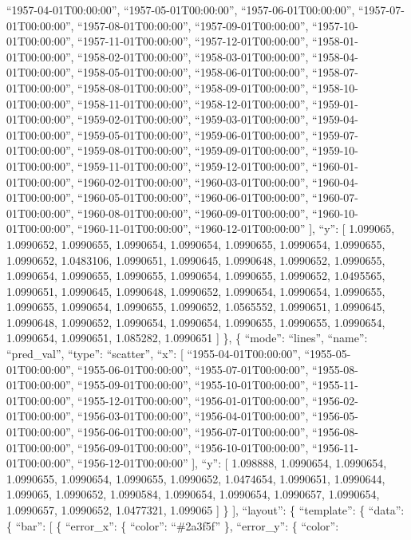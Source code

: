 \documentclass[
]{article}
\begin{document}
``1957-04-01T00:00:00'', ``1957-05-01T00:00:00'',
``1957-06-01T00:00:00'', ``1957-07-01T00:00:00'',
``1957-08-01T00:00:00'', ``1957-09-01T00:00:00'',
``1957-10-01T00:00:00'', ``1957-11-01T00:00:00'',
``1957-12-01T00:00:00'', ``1958-01-01T00:00:00'',
``1958-02-01T00:00:00'', ``1958-03-01T00:00:00'',
``1958-04-01T00:00:00'', ``1958-05-01T00:00:00'',
``1958-06-01T00:00:00'', ``1958-07-01T00:00:00'',
``1958-08-01T00:00:00'', ``1958-09-01T00:00:00'',
``1958-10-01T00:00:00'', ``1958-11-01T00:00:00'',
``1958-12-01T00:00:00'', ``1959-01-01T00:00:00'',
``1959-02-01T00:00:00'', ``1959-03-01T00:00:00'',
``1959-04-01T00:00:00'', ``1959-05-01T00:00:00'',
``1959-06-01T00:00:00'', ``1959-07-01T00:00:00'',
``1959-08-01T00:00:00'', ``1959-09-01T00:00:00'',
``1959-10-01T00:00:00'', ``1959-11-01T00:00:00'',
``1959-12-01T00:00:00'', ``1960-01-01T00:00:00'',
``1960-02-01T00:00:00'', ``1960-03-01T00:00:00'',
``1960-04-01T00:00:00'', ``1960-05-01T00:00:00'',
``1960-06-01T00:00:00'', ``1960-07-01T00:00:00'',
``1960-08-01T00:00:00'', ``1960-09-01T00:00:00'',
``1960-10-01T00:00:00'', ``1960-11-01T00:00:00'',
``1960-12-01T00:00:00'' {]}, ``y'': {[} 1.099065, 1.0990652, 1.0990655,
1.0990654, 1.0990654, 1.0990655, 1.0990654, 1.0990655, 1.0990652,
1.0483106, 1.0990651, 1.0990645, 1.0990648, 1.0990652, 1.0990655,
1.0990654, 1.0990655, 1.0990655, 1.0990654, 1.0990655, 1.0990652,
1.0495565, 1.0990651, 1.0990645, 1.0990648, 1.0990652, 1.0990654,
1.0990654, 1.0990655, 1.0990655, 1.0990654, 1.0990655, 1.0990652,
1.0565552, 1.0990651, 1.0990645, 1.0990648, 1.0990652, 1.0990654,
1.0990654, 1.0990655, 1.0990655, 1.0990654, 1.0990654, 1.0990651,
1.085282, 1.0990651 {]} \}, \{ ``mode'': ``lines'', ``name'':
``pred\_val'', ``type'': ``scatter'', ``x'': {[}
``1955-04-01T00:00:00'', ``1955-05-01T00:00:00'',
``1955-06-01T00:00:00'', ``1955-07-01T00:00:00'',
``1955-08-01T00:00:00'', ``1955-09-01T00:00:00'',
``1955-10-01T00:00:00'', ``1955-11-01T00:00:00'',
``1955-12-01T00:00:00'', ``1956-01-01T00:00:00'',
``1956-02-01T00:00:00'', ``1956-03-01T00:00:00'',
``1956-04-01T00:00:00'', ``1956-05-01T00:00:00'',
``1956-06-01T00:00:00'', ``1956-07-01T00:00:00'',
``1956-08-01T00:00:00'', ``1956-09-01T00:00:00'',
``1956-10-01T00:00:00'', ``1956-11-01T00:00:00'',
``1956-12-01T00:00:00'' {]}, ``y'': {[} 1.098888, 1.0990654, 1.0990654,
1.0990655, 1.0990654, 1.0990655, 1.0990652, 1.0474654, 1.0990651,
1.0990644, 1.099065, 1.0990652, 1.0990584, 1.0990654, 1.0990654,
1.0990657, 1.0990654, 1.0990657, 1.0990652, 1.0477321, 1.099065 {]} \}
{]}, ``layout'': \{ ``template'': \{ ``data'': \{ ``bar'': {[} \{
``error\_x'': \{ ``color'': ``\#2a3f5f'' \}, ``error\_y'': \{ ``color'':
\end{document}
